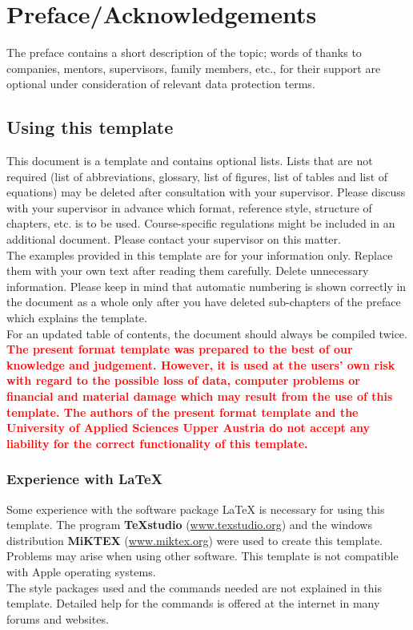 \chapter{Preface/Acknowledgements}
The preface contains a short description of the topic; words of thanks to companies, mentors, supervisors, family members, etc., for their support are optional under consideration of relevant data protection terms.

\section{Using this template}
This document is a template and contains optional lists. Lists that are not required (list of abbreviations, glossary, list of figures, list of tables and list of equations) may be deleted after consultation with your supervisor. Please discuss with your supervisor in advance which format, reference style, structure of chapters, etc. is to be used. Course-specific regulations might be included in an additional document. Please contact your supervisor on this matter.
\vspace{6pt}\\
The examples provided in this template are for your information only. Replace them with your own text after reading them carefully. Delete unnecessary information. Please keep in mind that automatic numbering is shown correctly in the document as a whole only after you have deleted sub-chapters of the preface which explains the template.
\vspace{6pt}\\
For an updated table of contents, the document should always be compiled twice.
\vspace{6pt}\\
\textcolor{red}{\textbf{The present format template was prepared to the best of our knowledge and judgement. However, it is used at the users’ own risk with regard to the possible loss of data, computer problems or financial and material damage which may result from the use of this template. The authors of the present format template and the University of Applied Sciences Upper Austria do not accept any liability for the correct functionality of this template.}}

\newpage
\subsection{Experience with \LaTeX}
Some experience with the software package {\LaTeX} is necessary for using this template. The program \textbf{TeXstudio} (\url{www.texstudio.org}) and the windows distribution \textbf{MiKTEX} (\url{www.miktex.org}) were used to create this template. Problems may arise when using other software. This template is not compatible with Apple operating systems.\\
The style packages used and the commands needed are not explained in this template. Detailed help for the commands is offered at the internet in many forums and websites.

